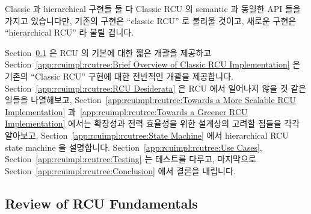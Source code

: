 Classic 과 hierarchical 구현들 둘 다 Classic RCU 의 semantic 과 동일한 API 들을
가지고 있습니다만, 기존의 구현은 ``classic RCU'' 로 불리울 것이고, 새로운
구현은 ``hierarchical RCU'' 라 불릴 겁니다.
\iffalse

Both the classic and the hierarchical implementations
have Classic RCU semantics and identical APIs, however,
the old implementation will be called ``classic RCU''
and the new implementation will be called ``hierarchical RCU''.
\fi

Section~\ref{app:rcuimpl:rcutree:Review of RCU Fundamentals}
은 RCU 의 기본에 대한 짧은 개괄을 제공하고
Section~\ref{app:rcuimpl:rcutree:Brief Overview of Classic RCU Implementation}
은 기존의 ``Classic RCU'' 구현에 대한 전반적인 개괄을 제공합니다.
Section~\ref{app:rcuimpl:rcutree:RCU Desiderata}
은 RCU 에서 일어나지 않을 것 같은 일들을 나열해보고,
Section~\ref{app:rcuimpl:rcutree:Towards a More Scalable RCU Implementation}
과~\ref{app:rcuimpl:rcutree:Towards a Greener RCU Implementation}
에서는 확장성과 전력 효율성을 위한 설계상의 고려할 점들을 각각 알아보고,
Section~\ref{app:rcuimpl:rcutree:State Machine}
에서 hierarchical RCU state machine 을 설명합니다.
Section~\ref{app:rcuimpl:rcutree:Use Cases},
Section~\ref{app:rcuimpl:rcutree:Testing}
는 테스트를 다루고, 마지막으로
Section~\ref{app:rcuimpl:rcutree:Conclusion}
에서 결론을 내립니다.
\iffalse

Section~\ref{app:rcuimpl:rcutree:Review of RCU Fundamentals}
gives a brief review of RCU fundamentals and
Section~\ref{app:rcuimpl:rcutree:Brief Overview of Classic RCU Implementation}
gives a brief overview of the old ``Classic RCU'' implementation.
Section~\ref{app:rcuimpl:rcutree:RCU Desiderata}
lists RCU desiderata,
Sections~\ref{app:rcuimpl:rcutree:Towards a More Scalable RCU Implementation}
and~\ref{app:rcuimpl:rcutree:Towards a Greener RCU Implementation}
lay out design considerations for scalability and energy efficiency,
respectively, and
Section~\ref{app:rcuimpl:rcutree:State Machine}
describes the hierarchical RCU state machine.
Section~\ref{app:rcuimpl:rcutree:Use Cases},
Section~\ref{app:rcuimpl:rcutree:Testing}
covers testing, and finally,
Section~\ref{app:rcuimpl:rcutree:Conclusion}
presents concluding remarks.
\fi

\subsection{Review of RCU Fundamentals}
\label{app:rcuimpl:rcutree:Review of RCU Fundamentals}

